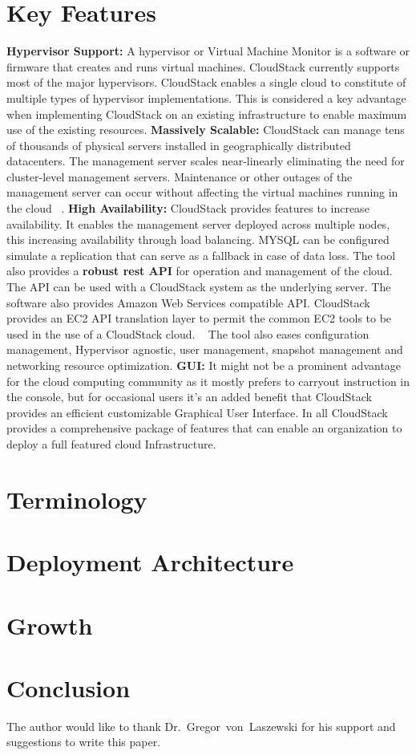 \section{Key Features}
{\bf Hypervisor Support: } A hypervisor or Virtual Machine Monitor is a software or firmware that creates 
and runs virtual machines. CloudStack currently supports most of the major hypervisors.  CloudStack enables 
a single cloud to constitute of multiple types of hypervisor implementations. This is considered a key 
advantage when implementing CloudStack on an existing infrastructure to enable maximum use of the existing 
resources. {\bf Massively Scalable:} CloudStack can manage tens of thousands of physical servers installed
in geographically distributed datacenters. The management server scales near-linearly eliminating the need for
cluster-level management servers. Maintenance or other outages of the management server can occur without
affecting the virtual machines running in the cloud ~\cite{hid-sp18-417-www-cloudstack-scalability}. 
{\bf High Availability:} CloudStack provides features to increase availability. It enables the management server 
deployed across multiple nodes, this increasing availability through load balancing. MYSQL can be configured
simulate a replication that can serve as a fallback in case of data loss. The tool also provides a {\bf robust rest API} 
for operation and management of the cloud. The API can be used with a CloudStack system as the underlying server. 
The software also provides Amazon Web Services compatible API. CloudStack provides an EC2 API translation layer
to permit the common EC2 tools to be used in the use of a CloudStack cloud. ~\cite{hid-sp18-417-www-cloudstack-aws}
The tool also eases configuration management, Hypervisor agnostic, user management, snapshot management and 
networking resource optimization. 
{\bf GUI: } It might not be a prominent advantage for the cloud computing community as it mostly prefers to carryout 
instruction in the console, but for occasional users it’s an added benefit that CloudStack provides an efficient 
customizable Graphical User Interface. In all CloudStack provides a comprehensive package of features that can enable 
an organization to deploy a full featured cloud Infrastructure.

\section{Terminology}

\section{Deployment Architecture}


\section{Growth}

\section{Conclusion}

\begin{acks}

  The author would like to thank Dr.~Gregor~von~Laszewski for his
  support and suggestions to write this paper.

\end{acks}


 
